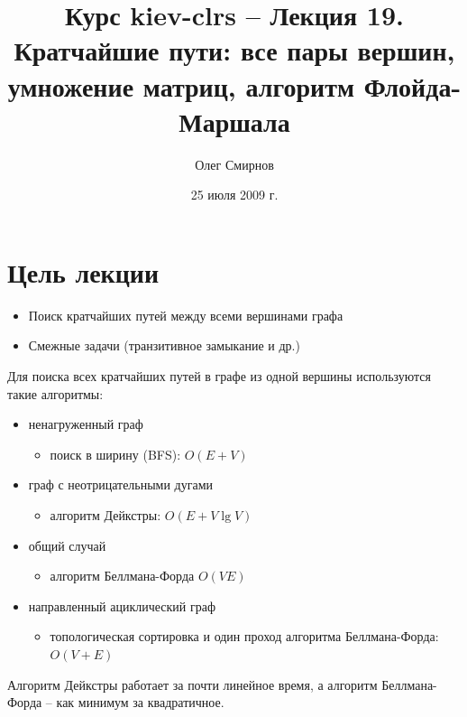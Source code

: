 \documentclass[11pt]{article}
\author{Олег Смирнов}
\title{Курс kiev-clrs -- Лекция 19. Кратчайшие пути: все пары вершин, умножение матриц, алгоритм Флойда-Маршала}
\date{25 июля 2009 г.}
\begin{document}
\maketitle
\tableofcontents
\newpage
\setlength{\parskip}{1ex plus 0.5ex minus 0.2ex}
\section{Цель лекции}
\begin{itemize}
\item Поиск кратчайших путей между всеми вершинами графа
\item Смежные задачи (транзитивное замыкание и др.)
\end{itemize}

Для поиска всех кратчайших путей в графе из одной вершины используются такие алгоритмы:
\begin{itemize}
\item ненагруженный граф
  \begin{itemize}
  \item поиск в ширину (BFS): $O(E + V)$
  \end{itemize}
\item граф с неотрицательными дугами
  \begin{itemize}
  \item алгоритм Дейкстры: $O(E + V \lg V)$
  \end{itemize}
\item общий случай
  \begin{itemize}
  \item алгоритм Беллмана-Форда $O(VE)$
  \end{itemize}
\item направленный ациклический граф
  \begin{itemize}
  \item топологическая сортировка и один проход алгоритма Беллмана-Форда: $O(V+E)$
  \end{itemize}
\end{itemize}
Алгоритм Дейкстры работает за почти линейное время, а алгоритм Беллмана-Форда -- как минимум за квадратичное.
\end{document}
